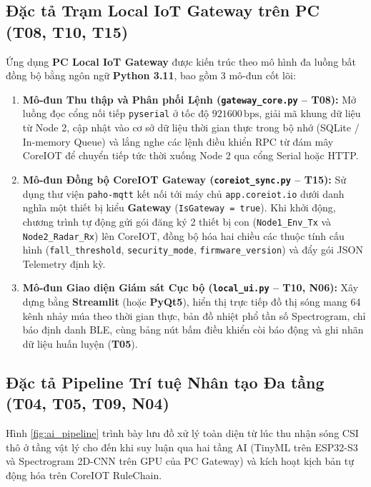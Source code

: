 \documentclass{hcmut-report}
\begin{document}
\subsection[Đặc tả Trạm Local IoT Gateway trên PC (T08, T10, T15)]{Đặc tả Trạm Local IoT Gateway trên PC (T08, T10, T15)}
Ứng dụng \textbf{PC Local IoT Gateway} được kiến trúc theo mô hình đa luồng bất đồng bộ bằng ngôn ngữ \textbf{Python 3.11}, bao gồm 3 mô-đun cốt lõi:
\begin{enumerate}
  \item \textbf{Mô-đun Thu thập và Phân phối Lệnh (\texttt{gateway\_core.py} -- T08):} Mở luồng đọc cổng nối tiếp \texttt{pyserial} ở tốc độ $921600\,\text{bps}$, giải mã khung dữ liệu từ Node 2, cập nhật vào cơ sở dữ liệu thời gian thực trong bộ nhớ (SQLite / In-memory Queue) và lắng nghe các lệnh điều khiển RPC từ đám mây CoreIOT để chuyển tiếp tức thời xuống Node 2 qua cổng Serial hoặc HTTP.
  \item \textbf{Mô-đun Đồng bộ CoreIOT Gateway (\texttt{coreiot\_sync.py} -- T15):} Sử dụng thư viện \texttt{paho-mqtt} kết nối tới máy chủ \texttt{app.coreiot.io} dưới danh nghĩa một thiết bị kiểu \textbf{Gateway} (\texttt{IsGateway = true}). Khi khởi động, chương trình tự động gửi gói đăng ký 2 thiết bị con (\texttt{Node1\_Env\_Tx} và \texttt{Node2\_Radar\_Rx}) lên CoreIOT, đồng bộ hóa hai chiều các thuộc tính cấu hình (\texttt{fall\_threshold}, \texttt{security\_mode}, \texttt{firmware\_version}) và đẩy gói JSON Telemetry định kỳ.
  \item \textbf{Mô-đun Giao diện Giám sát Cục bộ (\texttt{local\_ui.py} -- T10, N06):} Xây dựng bằng \textbf{Streamlit} (hoặc \textbf{PyQt5}), hiển thị trực tiếp đồ thị sóng mang 64 kênh nhảy múa theo thời gian thực, bản đồ nhiệt phổ tần số Spectrogram, chỉ báo định danh BLE, cùng bảng nút bấm điều khiển còi báo động và ghi nhãn dữ liệu huấn luyện (\textbf{T05}).
\end{enumerate}

\subsection[Đặc tả Pipeline Trí tuệ Nhân tạo Đa tầng (T04, T05, T09, N04)]{Đặc tả Pipeline Trí tuệ Nhân tạo Đa tầng (T04, T05, T09, N04)}
Hình \ref{fig:ai_pipeline} trình bày lưu đồ xử lý toàn diện từ lúc thu nhận sóng CSI thô ở tầng vật lý cho đến khi suy luận qua hai tầng AI (TinyML trên ESP32-S3 và Spectrogram 2D-CNN trên GPU của PC Gateway) và kích hoạt kịch bản tự động hóa trên CoreIOT RuleChain.
\end{document}
